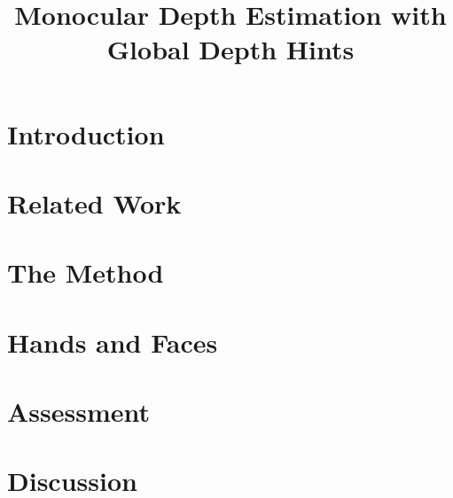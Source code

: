 \documentclass[acmtog,anonymous,timestamp,review]{acmart}
\begin{document}


\title{Monocular Depth Estimation with Global Depth Hints}

\section{Introduction}


\section{Related Work}


\section{The Method}


\section{Hands and Faces}


\section{Assessment}


\section{Discussion}




\end{document}
